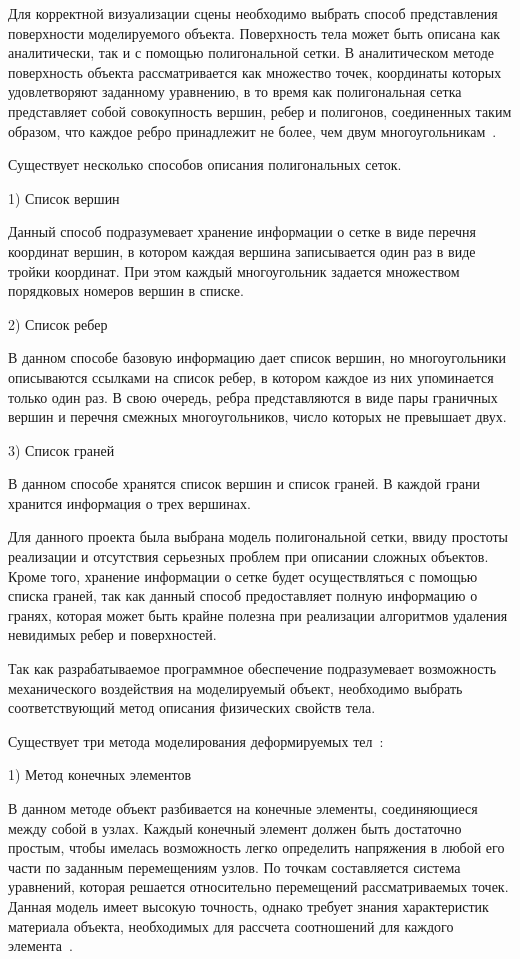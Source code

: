 Для корректной визуализации сцены необходимо выбрать способ представления поверхности моделируемого объекта. Поверхность тела может быть описана как аналитически, так и с помощью полигональной сетки. В аналитическом методе поверхность объекта рассматривается как множество точек, координаты которых удовлетворяют заданному уравнению, в то время как полигональная сетка представляет собой совокупность вершин, ребер и полигонов, соединенных таким образом, что каждое ребро принадлежит не более, чем двум многоугольникам~\cite{bojko}.

Существует несколько способов описания полигональных сеток.

1) Список вершин

Данный способ подразумевает хранение информации о сетке в виде перечня координат вершин, в котором каждая вершина записывается один раз в виде тройки координат. При этом каждый многоугольник задается множеством порядковых номеров вершин в списке.

2) Список ребер

В данном способе базовую информацию дает список вершин, но многоугольники описываются ссылками на список ребер, в котором каждое из них упоминается только один раз. В свою очередь, ребра представляются в виде пары граничных вершин и перечня смежных многоугольников, число которых не превышает двух.

3) Список граней

В данном способе хранятся список вершин и список граней. В каждой грани хранится информация о трех вершинах.

Для данного проекта была выбрана модель полигональной сетки, ввиду простоты реализации и отсутствия серьезных проблем при описании сложных объектов. Кроме того, хранение информации о сетке будет осуществляться с помощью списка граней, так как данный способ предоставляет полную информацию о гранях, которая может быть крайне полезна при реализации алгоритмов удаления невидимых ребер и поверхностей.

Так как разрабатываемое программное обеспечение подразумевает возможность механического воздействия на моделируемый объект, необходимо выбрать соответствующий метод описания физических свойств тела.

Существует три метода моделирования деформируемых тел~\cite{muller}:

1) Метод конечных элементов

В данном методе объект разбивается на конечные элементы, соединяющиеся
между собой в узлах. Каждый конечный элемент должен быть достаточно
простым, чтобы имелась возможность легко определить напряжения в любой его части по заданным перемещениям узлов. По точкам составляется система уравнений, которая решается относительно перемещений рассматриваемых точек. Данная модель имеет высокую точность, однако требует знания характеристик материала объекта, необходимых для рассчета соотношений для каждого элемента~\cite{muller}.

